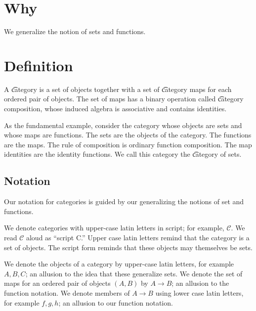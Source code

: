 

\section*{Why}

We generalize the notion of sets and functions.

\section*{Definition}

A \t{category} is a set of
objects together with a set of
\t{category maps} for each
ordered pair of objects.
The set of maps has a binary operation called
\t{category composition},
whose induced algebra is associative and contains identities.

As the fundamental example, consider the category whose
objects are sets and whose maps are functions.
The sets are the objects of the category.
The functions are the maps.
The rule of composition is ordinary function composition.
The map identities are the identity functions.
We call this category the \t{category of sets}.

\subsection*{Notation}

Our notation for categories is guided by our generalizing the notions of set and functions.

We denote categories with upper-case latin letters
in script; for example, $\mathcal{C} $.
We read $\mathcal{C} $ aloud as ``script C.''
Upper case latin letters remind that the category is a set of objects.
The script form reminds that these objects may themselves be sets.

We denote the objects of a category by upper-case latin letters,
for example $A, B, C$; an allusion to the idea that these generalize sets.
We denote the set of maps for an ordered pair of objects $(A, B)$
by $A \to B$; an allusion to the function notation.
We denote members of $A \to B$ using lower case latin letters,
for example $f, g, h$; an allusion to our function notation.

